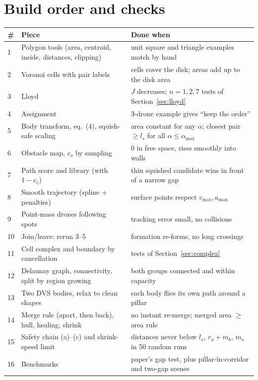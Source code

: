 \documentclass[11pt,a4paper]{article}
\begin{document}
\section{Build order and checks}
\begin{center}\small
\begin{tabular}{@{}p{0.4cm}p{5.3cm}p{8.6cm}@{}}
\toprule
\# & Piece & Done when\\
\midrule
1 & Polygon tools (area, centroid, inside, distances, clipping) & unit square and triangle examples match by hand\\
2 & Voronoi cells with pair labels & cells cover the disk; areas add up to the disk area\\
3 & Lloyd & $J$ decreases; $n=1,2,7$ tests of Section~\ref{sec:lloyd}\\
4 & Assignment & 3-drone example gives ``keep the order''\\
5 & Body transform, eq.~(4), squish-safe scaling & area constant for any $\alpha$; closest pair $\ge l_s$ for all $\alpha\le\alpha_{\max}$\\
6 & Obstacle map, $c_o$ by sampling & 0 in free space, rises smoothly into walls\\
7 & Path score and library (with $1-c_e$) & thin squished candidate wins in front of a narrow gap\\
8 & Smooth trajectory (spline + penalties) & surface points respect $v_{\max},a_{\max}$\\
9 & Point-mass drones following spots & tracking error small, no collisions\\
10 & Join/leave: rerun 3--5 & formation re-forms, no long crossings\\
11 & Cell complex and boundary by cancellation & tests of Section~\ref{sec:complex}\\
12 & Delaunay graph, connectivity, split by region growing & both groups connected and within capacity\\
13 & Two DVS bodies, relax to clean shapes & each body flies its own path around a pillar\\
14 & Merge rule (apart, then back), hull, healing, shrink & no instant re-merge; merged area $\ge$ area rule\\
15 & Safety chain (a)--(c) and shrink-speed limit & distances never below $l_s$, $r_a+m_b$, $m_o$ in 50 random runs\\
16 & Benchmarks & paper's gap test, plus pillar-in-corridor and two-gap scenes\\
\bottomrule
\end{tabular}
\end{center}
\end{document}
